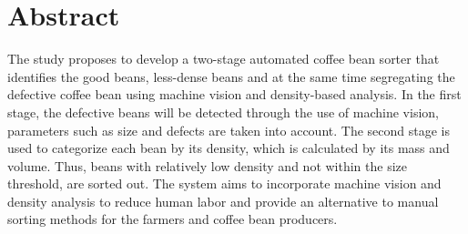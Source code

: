 \chapter*{Abstract}

The study proposes to develop a two-stage automated coffee bean sorter that identifies the good beans, less-dense beans and at the same time segregating the defective coffee bean using machine vision and density-based analysis. In the first stage, the defective beans will be detected through the use of machine vision, parameters such as size and defects are taken into account. The second stage is used to categorize each bean by its density, which is calculated by its mass and volume. Thus, beans with relatively low density and not within the size threshold, are sorted out. The system aims to incorporate machine vision and density analysis to reduce human labor and provide an alternative to manual sorting methods for the farmers and coffee bean producers. 

